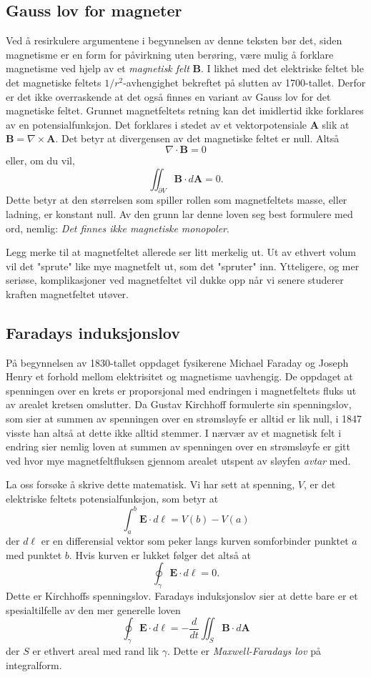 \documentclass[twoside,utf8]{article}
\begin{document}
\subsection{Gauss lov for magneter}
Ved å resirkulere argumentene i begynnelsen av denne teksten bør det, siden magnetisme er en form for påvirkning uten berøring, være mulig å forklare magnetisme ved hjelp av et {\it magnetisk felt} $\mathbf{B}$. I likhet med det elektriske feltet ble det magnetiske feltets $1/r^2$-avhengighet bekreftet på slutten av 1700-tallet. Derfor er det ikke overraskende at det også finnes en variant av Gauss lov for det magnetiske feltet. Grunnet magnetfeltets retning kan det imidlertid ikke forklares av en potensialfunksjon. Det forklares i stedet av et vektorpotensiale $\mathbf{A}$ slik at $\mathbf{B}=\nabla \times \mathbf{A}$. Det betyr at divergensen av det magnetiske feltet er null. Altså
$$
\nabla \cdot \mathbf{B} = 0
$$
eller, om du vil,
$$
\iint_{\partial V} \mathbf{B} \cdot d\mathbf{A} = 0.
$$
Dette betyr at den størrelsen som spiller rollen som magnetfeltets masse, eller ladning, er konstant null. Av den grunn lar denne loven seg best formulere med ord, nemlig: {\it Det finnes ikke magnetiske monopoler}.


  Legg merke til at magnetfeltet allerede ser litt merkelig ut. Ut av ethvert volum vil det "sprute" like mye magnetfelt ut, som det "spruter" inn. Ytteligere, og mer seriøse, komplikasjoner ved magnetfeltet vil dukke opp når vi senere studerer kraften magnetfeltet utøver.




\subsection{Faradays induksjonslov}
På begynnelsen av 1830-tallet oppdaget fysikerene Michael Faraday og Joseph Henry et forhold mellom elektrisitet og magnetisme uavhengig. De oppdaget at spenningen over en krets er proporsjonal med endringen i magnetfeltets fluks ut av arealet kretsen omslutter.
Da Gustav Kirchhoff formulerte sin spenningslov, som sier at summen av spenningen over en strømsløyfe er alltid er lik null, i 1847 visste han altså at dette ikke alltid stemmer. I nærvær av et magnetisk felt i endring sier nemlig loven at summen av spenningen over en strømsløyfe er gitt ved hvor mye magnetfeltfluksen gjennom arealet utspent av sløyfen {\it avtar} med.


  La oss forsøke å skrive dette matematisk. Vi har sett at spenning, $V$, er det elektriske feltets potensialfunksjon, som betyr at
  $$
  \int_a^b \mathbf{E} \cdot d\mathbf{\ell} = V(b)-V(a)
  $$
  der $d\mathbf{\ell}$ er en differensial vektor som peker langs kurven somforbinder punktet $a$ med punktet $b$. Hvis kurven er lukket følger det altså at
  $$
  \oint_\gamma \mathbf{E} \cdot d\mathbf{\ell} = 0.
  $$
  Dette er Kirchhoffs spenningslov. Faradays induksjonslov sier at dette bare er et spesialtilfelle av den mer generelle loven
  $$
  \oint_\gamma \mathbf{E} \cdot d\mathbf{\ell} = -\frac{d}{dt}\iint_S \mathbf{B} \cdot d\mathbf{A}
  $$
  der $S$ er ethvert areal med rand lik $\gamma$. Dette er {\it Maxwell-Faradays lov} på integralform.
\end{document}
